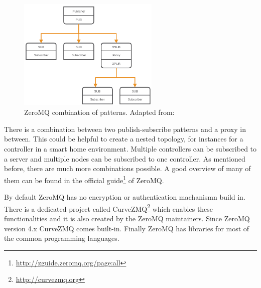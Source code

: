 \begin{figure}[H]
    \centering
    \includegraphics[width=0.6\textwidth]{resources/images/zeromq-complex.png}
    \caption[ZeroMQ combination of patterns]{ZeroMQ combination of patterns. Adapted from: \autocite{ZeroMQ:Guide}}
    \label{fig:zeromq_comination}
\end{figure}
There is a combination between two publish-subscribe patterns and a proxy in between.
This could be helpful to create a nested topology, for instances for a controller in a smart home environment.
Multiple controllers can be subscribed to a server and multiple nodes can be subscribed to one controller.
As mentioned before, there are much more combinations possible.
A good overview of many of them can be found in the official guide\footnote{\url{http://zguide.zeromq.org/page:all}} of ZeroMQ.

By default ZeroMQ has no encryption or authentication machanismn build in.
There is a dedicated project called CurveZMQ\footnote{\url{http://curvezmq.org}} which enables these functionalities and it is also created by the ZeroMQ maintainers.
Since ZeroMQ version 4.x CurveZMQ comes built-in.
Finally ZeroMQ has libraries for most of the common programming languages.
